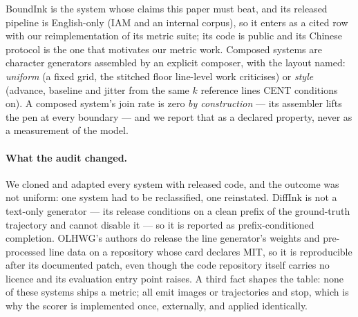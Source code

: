 \documentclass[conference]{IEEEtran}
\begin{document}
BoundInk \cite{boundink} is the system whose claims this paper must beat, and its released
pipeline is English-only (IAM and an internal corpus), so it enters as a cited row with our
reimplementation of its metric suite; its code is public and its Chinese protocol is the one
that motivates our metric work. Composed systems are character generators assembled by an
explicit composer, with the layout named: \emph{uniform} (a fixed grid, the stitched floor
line-level work criticises) or \emph{style} (advance, baseline and jitter from the same $k$
reference lines CENT conditions on). A composed system's join rate is zero \emph{by
construction} --- its assembler lifts the pen at every boundary --- and we report that as a
declared property, never as a measurement of the model.

\paragraph{What the audit changed.} We cloned and adapted every system with released code, and
the outcome was not uniform: one system had to be reclassified, one reinstated. DiffInk
\cite{diffink} is not a text-only generator --- its release conditions on a clean prefix of
the ground-truth trajectory and cannot disable it --- so it is reported as prefix-conditioned
completion. OLHWG's authors do release the line generator's weights and pre-processed line
data on a repository whose card declares MIT, so it is reproducible after its documented
patch, even though the code repository itself carries no licence and its evaluation entry
point raises. A third fact shapes the table: none of these systems ships a metric; all emit
images or trajectories and stop, which is why the scorer is implemented once, externally, and
applied identically.
\end{document}
